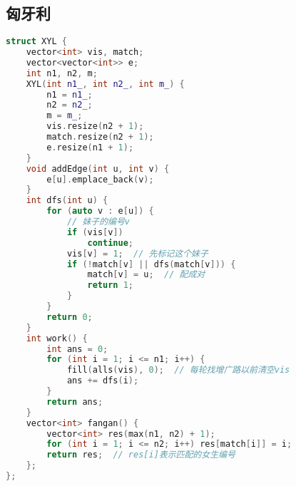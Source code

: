 \subsection{匈牙利}
\begin{lstlisting}[language=C++]
struct XYL {
    vector<int> vis, match;
    vector<vector<int>> e;
    int n1, n2, m;
    XYL(int n1_, int n2_, int m_) {
        n1 = n1_;
        n2 = n2_;
        m = m_;
        vis.resize(n2 + 1);
        match.resize(n2 + 1);
        e.resize(n1 + 1);
    }
    void addEdge(int u, int v) {
        e[u].emplace_back(v);
    }
    int dfs(int u) {
        for (auto v : e[u]) {
            // 妹子的编号v
            if (vis[v])
                continue;
            vis[v] = 1;  // 先标记这个妹子
            if (!match[v] || dfs(match[v])) {
                match[v] = u;  // 配成对
                return 1;
            }
        }
        return 0;
    }
    int work() {
        int ans = 0;
        for (int i = 1; i <= n1; i++) {
            fill(alls(vis), 0);  // 每轮找增广路以前清空vis
            ans += dfs(i);
        }
        return ans;
    }
    vector<int> fangan() {
        vector<int> res(max(n1, n2) + 1);
        for (int i = 1; i <= n2; i++) res[match[i]] = i;
        return res;  // res[i]表示匹配的女生编号
    };
};
\end{lstlisting}
